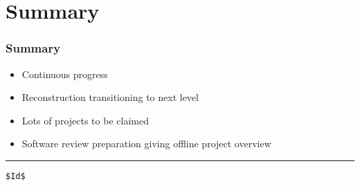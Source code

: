 \documentclass[xcolor=dvipsnames,hyperref={pdfpagelabels=false}]{beamer}
\newcommand{\bi}{\begin{itemize}}
\newcommand{\ei}{\end{itemize}}
\newcommand{\I}{\item}
\newcommand{\ft}{\frametitle}
\begin{document}
\section{Summary}

\begin{frame}[fragile]
\ft{Summary}
\bi
\I Continuous progress
\I Reconstruction transitioning to next level
\I Lots of projects to be claimed
\I Software review preparation giving offline project overview
\ei
\bigskip
\hrule
\tiny
\begin{verbatim}
$Id$
\end{verbatim}

\end{frame}
\end{document}
